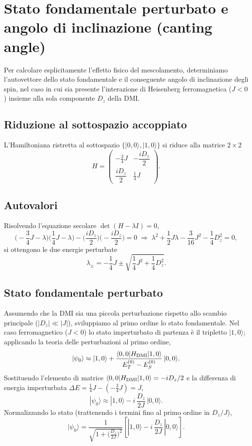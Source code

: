 \documentclass[11pt,a4paper]{article}
\begin{document}
\section{Stato fondamentale perturbato e angolo di inclinazione (canting angle)}

Per calcolare esplicitamente l'effetto fisico del mescolamento, determiniamo
l'autovettore dello stato fondamentale e il conseguente angolo di inclinazione degli
spin, nel caso in cui sia presente l'interazione di Heisenberg ferromagnetica ($J<0$)
insieme alla sola componente $D_z$ della DMI.

\subsection{Riduzione al sottospazio accoppiato}

L'Hamiltoniana ristretta al sottospazio $\{|0,0\rangle,|1,0\rangle\}$ si riduce alla
matrice $2\times2$
$$H = \begin{pmatrix} -\frac34 J & -\dfrac{iD_z}{2} \\[6pt] \dfrac{iD_z}{2} & \frac14 J \end{pmatrix}.$$

\subsection{Autovalori}

Risolvendo l'equazione secolare $\det(H-\lambda I)=0$,
$$\Big(-\frac34 J-\lambda\Big)\Big(\frac14 J-\lambda\Big) - \Big(\frac{iD_z}{2}\Big)\Big(-\frac{iD_z}{2}\Big) = 0 \;\Longrightarrow\; \lambda^2+\frac12 J\lambda-\frac{3}{16}J^2-\frac14 D_z^2=0,$$
si ottengono le due energie perturbate
$$\lambda_\pm = -\frac14 J \pm \sqrt{\frac14 J^2 + \frac14 D_z^2}.$$

\subsection{Stato fondamentale perturbato}

Assumendo che la DMI sia una piccola perturbazione rispetto allo scambio principale
($|D_z|\ll|J|$), sviluppiamo al primo ordine lo stato fondamentale. Nel caso
ferromagnetico ($J<0$) lo stato imperturbato di partenza \`e il tripletto
$|1,0\rangle$; applicando la teoria delle perturbazioni al primo ordine,
$$|\psi_0\rangle \approx |1,0\rangle + \frac{\langle0,0|H_{\rm DMI}|1,0\rangle}{E_T^{(0)}-E_S^{(0)}}\,|0,0\rangle.$$
Sostituendo l'elemento di matrice $\langle0,0|H_{\rm DMI}|1,0\rangle=-iD_z/2$ e la
differenza di energia imperturbata $\Delta E = \tfrac14 J-(-\tfrac34 J)=J$,
$$|\psi_0\rangle \approx |1,0\rangle - i\,\frac{D_z}{2J}\,|0,0\rangle.$$
Normalizzando lo stato (trattenendo i termini fino al primo ordine in $D_z/J$),
$$|\psi_0\rangle = \frac1{\sqrt{1+\big(\tfrac{D_z}{2J}\big)^2}}\left[|1,0\rangle - i\,\frac{D_z}{2J}\,|0,0\rangle\right].$$
\end{document}

